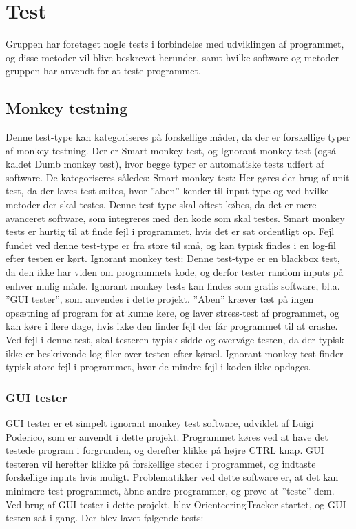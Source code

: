 \chapter{Test}
Gruppen har foretaget nogle tests i forbindelse med udviklingen af programmet, og disse metoder vil blive beskrevet herunder, samt hvilke software og metoder gruppen har anvendt for at teste programmet.

\section{Monkey testning}
Denne test-type kan kategoriseres på forskellige måder, da der er forskellige typer af monkey testning. Der er Smart monkey test, og Ignorant monkey test (også kaldet Dumb monkey test), hvor begge typer er automatiske tests udført af software. De kategoriseres således:
Smart monkey test: Her gøres der brug af unit test, da der laves test-suites, hvor ”aben” kender til input-type og ved hvilke metoder der skal testes. Denne test-type skal oftest købes, da det er mere avanceret software, som integreres med den kode som skal testes.\newline
Smart monkey tests er hurtig til at finde fejl i programmet, hvis det er sat ordentligt op. Fejl fundet ved denne test-type er fra store til små, og kan typisk findes i en log-fil efter testen er kørt.\newline
Ignorant monkey test: Denne test-type er en blackbox test, da den ikke har viden om programmets kode, og derfor tester random inputs på enhver mulig måde. Ignorant monkey tests kan findes som gratis software, bl.a. ”GUI tester”, som anvendes i dette projekt. ”Aben” kræver tæt på ingen opsætning af program for at kunne køre, og laver stress-test af programmet, og kan køre i flere dage, hvis ikke den finder fejl der får programmet til at crashe. Ved fejl i denne test, skal testeren typisk sidde og overvåge testen, da der typisk ikke er beskrivende log-filer over testen efter kørsel. Ignorant monkey test finder typisk store fejl i programmet, hvor de mindre fejl i koden ikke opdages. \citep{ExI}

\subsection{GUI tester}
GUI tester er et simpelt ignorant monkey test software, udviklet af Luigi Poderico, som er anvendt i dette projekt. Programmet køres ved at have det testede program i forgrunden, og derefter klikke på højre CTRL knap. GUI testeren vil herefter klikke på forskellige steder i programmet, og indtaste forskellige inputs hvis muligt. Problematikker ved dette software er, at det kan minimere test-programmet, åbne andre programmer, og prøve at ”teste” dem. \citep{GUItester} \newline
Ved brug af GUI tester i dette projekt, blev OrienteeringTracker startet, og GUI testen sat i gang. Der blev lavet følgende tests:

